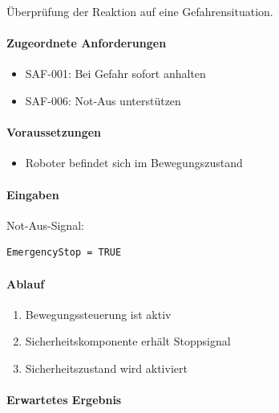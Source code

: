 \documentclass[
  a4paper,
  12pt,
  DIV=12,        %
  parskip=half,  %
  headings=small %
]{scrartcl}
\theoremstyle{definition}
\providecommand{\tightlist}{%
  \setlength{\itemsep}{0pt}\setlength{\parskip}{0pt}}
\theoremstyle{definition}
\begin{document}
Überprüfung der Reaktion auf eine Gefahrensituation.

\paragraph{Zugeordnete Anforderungen}\label{zugeordnete-anforderungen-7}

\begin{itemize}
\tightlist
\item
  SAF-001: Bei Gefahr sofort anhalten
\item
  SAF-006: Not-Aus unterstützen
\end{itemize}

\paragraph{Voraussetzungen}\label{voraussetzungen-7}

\begin{itemize}
\tightlist
\item
  Roboter befindet sich im Bewegungszustand
\end{itemize}

\paragraph{Eingaben}\label{eingaben-7}

Not-Aus-Signal:

\begin{verbatim}
EmergencyStop = TRUE
\end{verbatim}

\paragraph{Ablauf}\label{ablauf-7}

\begin{enumerate}
\def\labelenumi{\arabic{enumi}.}
\tightlist
\item
  Bewegungssteuerung ist aktiv
\item
  Sicherheitskomponente erhält Stoppsignal
\item
  Sicherheitszustand wird aktiviert
\end{enumerate}

\paragraph{Erwartetes Ergebnis}\label{erwartetes-ergebnis-7}
\end{document}
